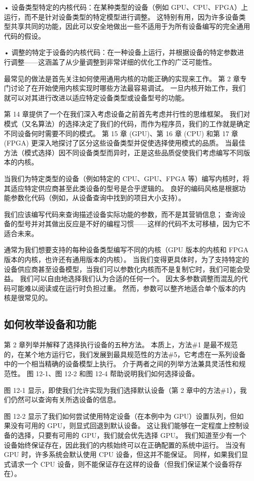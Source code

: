• 设备类型特定的内核代码：在某种类型的设备（例如 GPU、CPU、FPGA）上运行，而不是针对设备类型的特定模型进行调整。 这特别有用，因为许多设备类型共享共同的功能，因此可以安全地做出一些不适用于为所有设备编写的完全通用代码的假设。

• 调整的特定于设备的内核代码：在一种设备上运行，并根据设备的特定参数进行调整——这涵盖了从少量调整到非常详细的优化工作的广泛可能性。

最常见的做法是首先关注如何使用通用内核的功能正确的实现来工作。 第 2 章专门讨论了在开始使用内核实现时哪些方法最容易调试。 一旦内核开始工作，我们就可以对其进行改进以适应特定设备类型或设备型号的功能。

第 14 章提供了一个在我们深入考虑设备之前首先考虑并行性的思维框架。 我们对模式（又名算法）的选择决定了我们的代码，而作为程序员，我们的工作就是确定不同设备何时需要不同的模式。 第 15 章 (GPU)、第 16 章 (CPU) 和第 17 章 (FPGA) 更深入地探讨了区分这些设备类型并促使选择使用模式的品质。 当最佳方法（模式选择）因不同设备类型而异时，正是这些品质促使我们考虑编写不同版本的内核。

当我们为特定类型的设备（例如特定的 CPU、GPU、FPGA 等）编写内核时，将其适应特定供应商甚至此类设备的型号是合乎逻辑的。 良好的编码风格是根据功能参数化代码（例如，从设备查询中找到的项目大小支持）。

我们应该编写代码来查询描述设备实际功能的参数，而不是其营销信息； 查询设备的型号并对其做出反应是不好的编程习惯——这样的代码不太可移植，因为它不适合未来。

通常为我们想要支持的每种设备类型编写不同的内核（GPU 版本的内核和 FPGA 版本的内核，也许还有通用版本的内核）。 当我们变得更具体时，为了支持特定的设备供应商甚至设备模型，当我们可以参数化内核而不是复制它时，我们可能会受益。 我们可以自由地选择我们认为合适的任何一个。 因太多参数调整而混乱的代码可能难以阅读或在运行时负担过重。 然而，参数可以整齐地适合单个版本的内核是很常见的。

\subsection{如何枚举设备和功能}
第 2 章列举并解释了选择执行设备的五种方法。 本质上，方法\#1 是最不规范的，在某个地方运行它，我们发展到最具规范性的方法\#5，它考虑在一系列设备中的一个相当精确的设备模型上执行。 介于两者之间的列举方法兼具灵活性和规范性。 图 12-1、图 12-2 和图 12-4 帮助说明我们如何选择设备。

图 12-1 显示，即使我们允许实现为我们选择默认设备（第 2 章中的方法\#1），我们仍然可以查询有关所选设备的信息。

图 12-2 显示了我们如何尝试使用特定设备（在本例中为 GPU）设置队列，但如果没有可用的 GPU，则显式回退到默认设备。 这让我们能够在一定程度上控制设备的选择，只要有可用的 GPU，我们就会优先选择 GPU。 我们知道至少有一个设备始终保证存在，因此我们的内核始终可以在正确配置的系统中运行。 当没有 GPU 时，许多系统会默认使用 CPU 设备，但这并不能保证。 同样，如果我们显式请求一个 CPU 设备，则不能保证存在这样的设备（但我们保证某个设备将存在）。

